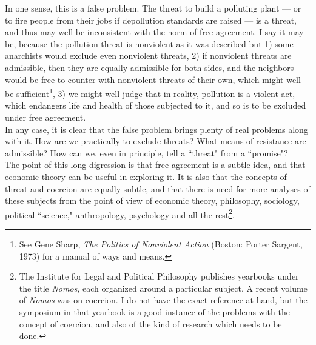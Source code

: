 \documentclass[12pt, onecolumn, letterpaper, oneside]{book}
\begin{document}
In one sense, this is a false problem. The threat to build a polluting plant --- or to fire people from their jobs if depollution standards are raised --- is a threat, and thus may well be inconsistent with the norm of free agreement. I say it may be, because the pollution threat is nonviolent as it was described but 1) some anarchists would exclude even nonviolent threats, 2) if nonviolent threats are admissible, then they are equally admissible for both sides, and the neighbors would be free to counter with nonviolent threats of their own, which might well be sufficient\footnote{See Gene Sharp, \emph{The Politics of Nonviolent Action} (Boston: Porter Sargent, 1973) for a manual of ways and means.}, 3) we might well judge that in reality, pollution is a violent act, which endangers life and health of those subjected to it, and so is to be excluded under free agreement.\\
In any case, it is clear that the false problem brings plenty of real problems along with it. How are we practically to exclude threats? What means of resistance are admissible? How can we, even in principle, tell a ``threat" from a ``promise"?\\
The point of this long digression is that free agreement is a subtle idea, and that economic theory can be useful in exploring it. It is also that the concepts of threat and coercion are equally subtle, and that there is need for more analyses of these subjects from the point of view of economic theory, philosophy, sociology, political ``science," anthropology, psychology and all the rest\footnote{The Institute for Legal and Political Philosophy publishes yearbooks under the title \emph{Nomos}, each organized around a particular subject. A recent volume of \emph{Nomos} was on coercion. I do not have the exact reference at hand, but the symposium in that yearbook is a good instance of the problems with the concept of coercion, and also of the kind of research which needs to be done.}.\\
\end{document}
